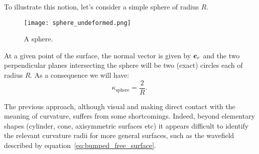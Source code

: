 To illustrate this notion, let's consider a simple sphere of radius $R$. 
\begin{figure}[htbp]
\begin{center}
\texttt{[image: sphere\_undeformed.png]} 
\end{center}
\caption{A sphere.}
\label{fig:sphere}
\end{figure}

At a given point of the surface, the normal vector is given by $\be_r$ and the two perpendicular planes intersecting the sphere will be two (exact) circles each of radius $R$. As a consequence we will have:
\begin{equation}
\kappa_\text{sphere} = \frac{2}{R}.
\end{equation}

The previous approach, although visual and making direct contact with the meaning of curvature, suffers from some shortcomings. Indeed, beyond elementary shapes (cylinder, cone, axisymmetric surfaces etc) it appears difficult to identify the relevant curvature radii for more general surfaces, such as the wavefield described by equation~\eqref{eq:bumped_free_surface}.

